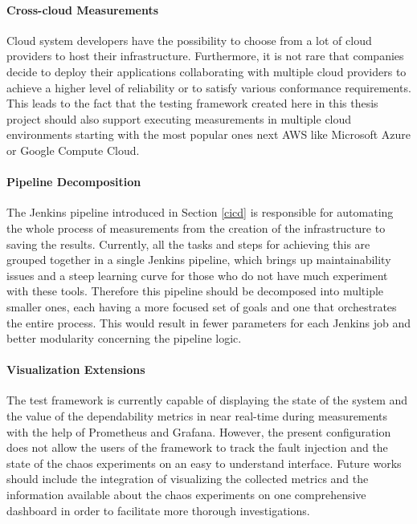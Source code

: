 \paragraph{Cross-cloud Measurements} Cloud system developers have the possibility to choose from a lot of cloud providers to host their infrastructure. Furthermore, it is not rare that companies decide to deploy their applications collaborating with multiple cloud providers to achieve a higher level of reliability or to satisfy various conformance requirements. This leads to the fact that the testing framework created here in this thesis project should also support executing measurements in multiple cloud environments starting with the most popular ones next AWS like Microsoft Azure or Google Compute Cloud. 

\paragraph{Pipeline Decomposition} The Jenkins pipeline introduced in Section \ref{cicd} is responsible for automating the whole process of measurements from the creation of the infrastructure to saving the results. Currently, all the tasks and steps for achieving this are grouped together in a single Jenkins pipeline, which brings up maintainability issues and a steep learning curve for those who do not have much experiment with these tools. Therefore this pipeline should be decomposed into multiple smaller ones, each having a more focused set of goals and one that orchestrates the entire process. This would result in fewer parameters for each Jenkins job and better modularity concerning the pipeline logic.

\paragraph{Visualization Extensions} The test framework is currently capable of displaying the state of the system and the value of the dependability metrics in near real-time during measurements with the help of Prometheus and Grafana. However, the present configuration does not allow the users of the framework to track the fault injection and the state of the chaos experiments on an easy to understand interface. Future works should include the integration of visualizing the collected metrics and the information available about the chaos experiments on one comprehensive dashboard in order to facilitate more thorough investigations.

